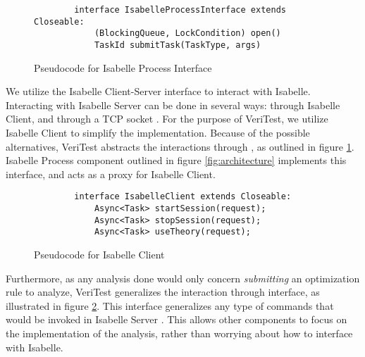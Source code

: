 \begin{figure}[!htb]
    \begin{lstlisting}
        interface IsabelleProcessInterface extends Closeable:
            (BlockingQueue, LockCondition) open()
            TaskId submitTask(TaskType, args)
    \end{lstlisting}

    \caption{Pseudocode for Isabelle Process Interface}
    \label{fig:IsabelleProcessInterface}
\end{figure}

We utilize the Isabelle Client-Server interface to interact with Isabelle. Interacting with Isabelle Server can be done in several ways: 
through Isabelle Client, and through a TCP socket \cite[Ch. 4]{isabelleSystem}. For the purpose of VeriTest, we utilize Isabelle Client to 
simplify the implementation. Because of the possible alternatives, VeriTest abstracts the interactions through , 
as outlined in figure \ref{fig:IsabelleProcessInterface}. Isabelle Process component outlined in figure \ref{fig:architecture} implements 
this interface, and acts as a proxy for Isabelle Client.

\begin{figure}[!htb]
    \begin{lstlisting}
        interface IsabelleClient extends Closeable:
            Async<Task> startSession(request);
            Async<Task> stopSession(request);
            Async<Task> useTheory(request);
    \end{lstlisting}

    \caption{Pseudocode for Isabelle Client}
    \label{fig:IsabelleClientInterface}
\end{figure}

Furthermore, as any analysis done would only concern \emph{submitting} an optimization rule to analyze, VeriTest generalizes the interaction 
through  interface, as illustrated in figure \ref{fig:IsabelleClientInterface}. This interface generalizes any type of 
commands that would be invoked in Isabelle Server \cite[Sec. 4.4]{isabelleSystem}. This allows other components to focus on the implementation 
of the analysis, rather than worrying about how to interface with Isabelle.

